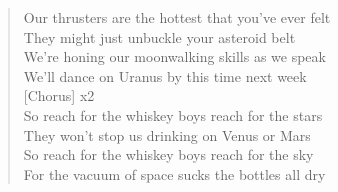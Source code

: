 \documentclass[11pt]{article}
\begin{document}
\begin{verse}
Our thrusters are the hottest that you've ever felt\\
They might just unbuckle your asteroid belt\\
We're honing our moonwalking skills as we speak\\
We'll dance on Uranus by this time next week\\
\vspace*{1em}
[Chorus] x2\\
So reach for the whiskey boys reach for the stars\\
They won't stop us drinking on Venus or Mars\\
So reach for the whiskey boys reach for the sky\\
For the vacuum of space sucks the bottles all dry\\
\end{verse}
\clearpage
\end{document}
